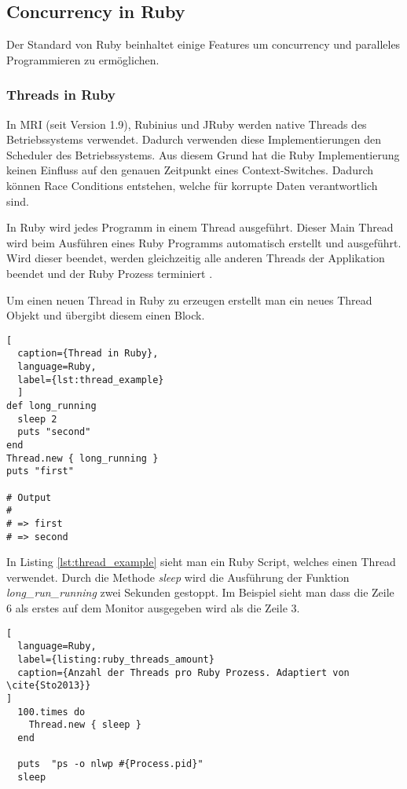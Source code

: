 \subsection{Concurrency in Ruby}
Der Standard von Ruby beinhaltet einige Features um concurrency und paralleles Programmieren zu ermöglichen.

\subsubsection{Threads in Ruby}
In MRI (seit Version 1.9), Rubinius und JRuby werden native Threads des Betriebssystems verwendet. Dadurch verwenden diese Implementierungen den Scheduler des Betriebssystems. Aus diesem Grund hat die Ruby Implementierung keinen Einfluss auf den genauen Zeitpunkt eines Context-Switches. Dadurch können Race Conditions entstehen, welche für korrupte Daten verantwortlich sind.

In Ruby wird jedes Programm in einem Thread ausgeführt. Dieser Main Thread wird beim Ausführen eines Ruby Programms automatisch erstellt und ausgeführt. Wird dieser beendet, werden gleichzeitig alle anderen Threads der Applikation beendet und der Ruby Prozess terminiert \cite[p. 15]{Sto2013}.

Um einen neuen Thread in Ruby zu erzeugen erstellt man ein neues Thread Objekt und übergibt diesem einen Block. 

\begin{lstlisting}[
  caption={Thread in Ruby}, 
  language=Ruby,
  label={lst:thread_example}
  ]
def long_running
  sleep 2
  puts "second"
end
Thread.new { long_running }
puts "first"

# Output
#
# => first
# => second

\end{lstlisting}

In Listing \ref{lst:thread_example} sieht man ein Ruby Script, welches einen Thread verwendet. Durch die Methode \emph{sleep} wird die Ausführung der Funktion \textit{long\_run\_running} zwei Sekunden gestoppt. Im Beispiel sieht man dass die Zeile 6 als erstes auf dem Monitor ausgegeben wird als die Zeile 3. 

\begin{lstlisting}[
  language=Ruby,
  label={listing:ruby_threads_amount}
  caption={Anzahl der Threads pro Ruby Prozess. Adaptiert von \cite{Sto2013}}
]
  100.times do
    Thread.new { sleep }
  end
  
  puts  "ps -o nlwp #{Process.pid}"
  sleep
\end{lstlisting} 

